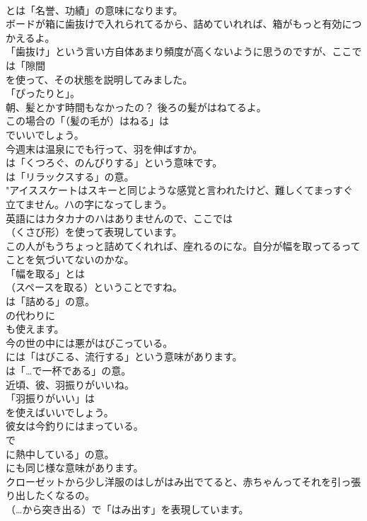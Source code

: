 \documentclass[8pt]{extreport}
\begin{document}
\begin{CJK}{UTF8}{min}
\\	とは「名誉、功績」の意味になります。	
\\	ボードが箱に歯抜けで入れられてるから、詰めていれれば、箱がもっと有効につかえるよ。 
\\	「歯抜け」という言い方自体あまり頻度が高くないように思うのですが、ここでは「隙間
\\	を使って、その状態を説明してみました。
\\	「ぴったりと」。	
\\	朝、髪とかす時間もなかったの？ 後ろの髪がはねてるよ。 
\\	この場合の「（髪の毛が）はねる」は
\\	でいいでしょう。	
\\	今週末は温泉にでも行って、羽を伸ばすか。 
\\	は「くつろぐ、のんびりする」という意味です。
\\	は「リラックスする」の意。	
\\	"アイススケートはスキーと同じような感覚と言われたけど、難しくてまっすぐ立てません。ハの字になってしまう。 
\\	英語にはカタカナのハはありませんので、ここでは
\\	（くさび形）を使って表現しています。
\\	この人がもうちょっと詰めてくれれば、座れるのにな。自分が幅を取ってるってことを気づいてないのかな。 
\\	「幅を取る」とは 
\\	（スペースを取る）ということですね。
\\	は「詰める」の意。
\\	の代わりに 
\\	も使えます。	
\\	今の世の中には悪がはびこっている。 
\\	には「はびこる、流行する」という意味があります。
\\	は「…で一杯である」の意。	
\\	近頃、彼、羽振りがいいね。 
\\	「羽振りがいい」は
\\	を使えばいいでしょう。	
\\	彼女は今釣りにはまっている。 
\\	で
\\	に熱中している」の意。
\\	にも同じ様な意味があります。	
\\	クローゼットから少し洋服のはしがはみ出でてると、赤ちゃんってそれを引っ張り出したくなるの。 
\\	（…から突き出る）で「はみ出す」を表現しています。	

\end{CJK}
\end{document}
